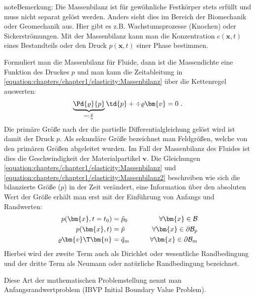 \documentclass[letterpaper,10pt,german]{jupyterBook}
\begin{document}
\begin{sphinxadmonition}{note}{Bemerkung:}
\sphinxAtStartPar
Die Massenbilanz ist für gewöhnliche Festkörper stets erfüllt und muss nicht separat gelöst werden. Anders sieht dies im Bereich der Biomechanik oder Geomechanik aus. Hier gibt es z.B. Wachstumsprozesse (Knochen) oder Sickerströmungen. Mit der Massenbilanz kann man die Konzentration \(c(\bm{x},t)\) eines Bestandteils oder den Druck \(p(\bm{x},t)\) einer Phase bestimmen.
\end{sphinxadmonition}

\sphinxAtStartPar
Formuliert man die Massenbilanz für Fluide, dann ist die Massendichte eine Funktion des Druckes \(p\) und man kann die Zeitableitung in \eqref{equation:chapters/chapter1/elasticity:Massenbilanz} über die Kettenregel auswerten:
\begin{equation}\label{equation:chapters/chapter1/elasticity:Massenbilanz2}
\begin{split} \underbrace{\Pd{\varrho}{p}}_{=:\frac{\varrho}{\kappa}} \td{p} + \div{\varrho {\bm{v}}} = 0 \; .\end{split}
\end{equation}
\sphinxAtStartPar
Die primäre Größe nach der die partielle Differentialgleichung gelöst wird ist damit der Druck \(p\). Als sekundäre Größe bezeichnet man Feldgrößen, welche von den primären Größen abgeleitet wurden. Im Fall der Massenbilanz des Fluides ist dies die Geschwindigkeit der Materialpartikel \(\bm{v}\). Die Gleichungen \eqref{equation:chapters/chapter1/elasticity:Massenbilanz} und \eqref{equation:chapters/chapter1/elasticity:Massenbilanz2} beschreiben wie sich die bilanzierte Größe (\(p\)) in der Zeit verändert, eine Information über den absoluten Wert der Größe erhält man erst mit der Einführung von Anfangs\sphinxhyphen{} und Randwerten:
\label{equation:chapters/chapter1/elasticity:b8b31b5c-f8df-431e-be1a-da9acb15a14d}\begin{align}
p(\bm{x},t=t_0) & = \tilde{p}_0 \qquad &\forall \bm{x} \in \mathcal{B}& \\
p(\bm{x},t) & = \tilde{p} \qquad &\forall \bm{x} \in \partial \mathcal{B}_p& \\
\varrho \bm{v}\T \bm{n} & = \tilde{q}_m \qquad &\forall \bm{x} \in \partial\mathcal{B}_m&
\end{align}
\sphinxAtStartPar
Hierbei wird der zweite Term auch als Dirichlet oder wesentliche Randbedingung und der dritte Term als Neumann oder natürliche Randbedingung bezeichnet.

\sphinxAtStartPar
Diese Art der mathematischen Problemstellung nennt man Anfangsrandwertproblem (IBVP \sphinxhyphen{} Initial Boundary Value Problem).
\end{document}

